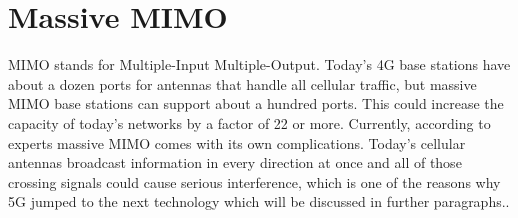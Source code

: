 \section{Massive MIMO}
MIMO stands for Multiple-Input Multiple-Output. Today’s 4G base stations have about a dozen ports for antennas that handle all cellular traffic, but massive MIMO base stations can support about a hundred ports. This could increase the capacity of today’s networks by a factor of 22 or more. Currently, according to experts massive MIMO comes with its own complications. Today’s cellular antennas broadcast information in every direction at once and all of those crossing signals could cause serious interference, which is one of the reasons why 5G jumped to the next technology which will be discussed in further paragraphs..\\
